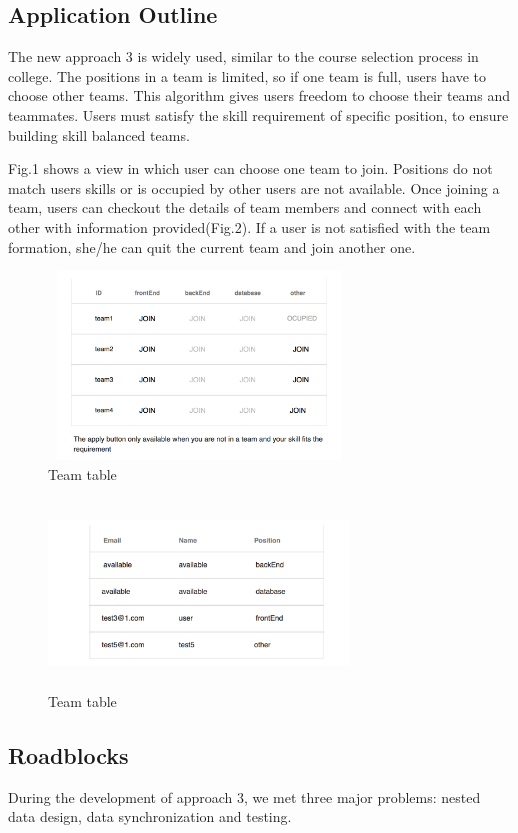 \documentclass[conference]{IEEEtran}
\begin{document}
\subsection{Application Outline}
The new approach 3 is widely used, similar to the course selection process in college. The positions in a team is limited, so if one team is full, users have to choose other teams. This algorithm gives users freedom to choose their teams and teammates. Users must satisfy the skill requirement of specific position, to ensure building skill balanced teams.

Fig.1 shows a view in which user can choose one team to join. Positions do not match users skills or is occupied by other users are not available. Once joining a team, users can checkout the details of team members and connect with each other with information provided(Fig.2). If a user is not satisfied with the team formation, she/he can quit the current team and join another one.

\begin{figure}[H]
  \includegraphics[width=8cm,height=5cm]{image/app3-teams.png}
  \caption{Team table}
  \label{fig:teams}
\end{figure}
\begin{figure}[H]
  \includegraphics[width=8cm,height=5cm]{image/app3-teaminfo.png}
  \caption{Team table}
  \label{fig:teams}
\end{figure}

\subsection{Roadblocks}
During the development of approach 3, we met three major problems: nested data design, data synchronization and testing.
\end{document}
